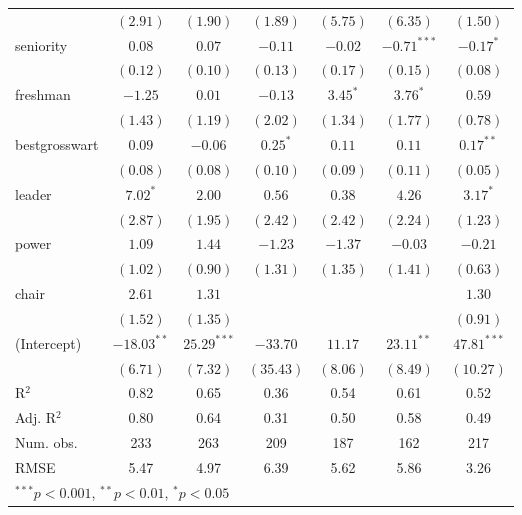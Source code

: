 \documentclass[12pt]{article}
\begin{document}
\begin{table}
\begin{center}
\begin{tabular}{l c c c c c c }
			& $(2.91)$      & $(1.90)$      & $(1.89)$     & $(5.75)$     & $(6.35)$      & $(1.50)$      \\
			seniority              & $0.08$        & $0.07$        & $-0.11$      & $-0.02$      & $-0.71^{***}$ & $-0.17^{*}$   \\
			& $(0.12)$      & $(0.10)$      & $(0.13)$     & $(0.17)$     & $(0.15)$      & $(0.08)$      \\
			freshman               & $-1.25$       & $0.01$        & $-0.13$      & $3.45^{*}$   & $3.76^{*}$    & $0.59$        \\
			& $(1.43)$      & $(1.19)$      & $(2.02)$     & $(1.34)$     & $(1.77)$      & $(0.78)$      \\
			bestgrosswart          & $0.09$        & $-0.06$       & $0.25^{*}$   & $0.11$       & $0.11$        & $0.17^{**}$   \\
			& $(0.08)$      & $(0.08)$      & $(0.10)$     & $(0.09)$     & $(0.11)$      & $(0.05)$      \\
			leader                 & $7.02^{*}$    & $2.00$        & $0.56$       & $0.38$       & $4.26$        & $3.17^{*}$    \\
			& $(2.87)$      & $(1.95)$      & $(2.42)$     & $(2.42)$     & $(2.24)$      & $(1.23)$      \\
			power                  & $1.09$        & $1.44$        & $-1.23$      & $-1.37$      & $-0.03$       & $-0.21$       \\
			& $(1.02)$      & $(0.90)$      & $(1.31)$     & $(1.35)$     & $(1.41)$      & $(0.63)$      \\
			chair                  & $2.61$        & $1.31$        &              &              &               & $1.30$        \\
			& $(1.52)$      & $(1.35)$      &              &              &               & $(0.91)$      \\
			(Intercept)            & $-18.03^{**}$ & $25.29^{***}$ & $-33.70$     & $11.17$      & $23.11^{**}$  & $47.81^{***}$ \\
			& $(6.71)$      & $(7.32)$      & $(35.43)$    & $(8.06)$     & $(8.49)$      & $(10.27)$     \\
			\hline
			R$^2$                  & 0.82          & 0.65          & 0.36         & 0.54         & 0.61          & 0.52          \\
			Adj. R$^2$             & 0.80          & 0.64          & 0.31         & 0.50         & 0.58          & 0.49          \\
			Num. obs.              & 233           & 263           & 209          & 187          & 162           & 217           \\
			RMSE                   & 5.47          & 4.97          & 6.39         & 5.62         & 5.86          & 3.26          \\
			\hline
			\multicolumn{7}{l}{\scriptsize{$^{***}p<0.001$, $^{**}p<0.01$, $^*p<0.05$}}
		\end{tabular}
	\end{center}
\end{table}
\end{document}
